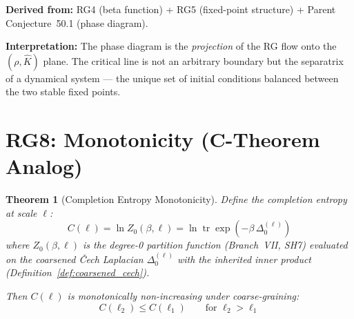 \documentclass[11pt,letterpaper]{article}
\newtheorem{theorem}[conjecture]{Theorem}
\newcommand{\Khat}{\hat{K}}
\newcommand{\tr}{\operatorname{tr}}
\begin{document}
\textbf{Derived from:} RG4 (beta function) + RG5 (fixed-point 
structure) + Parent Conjecture~50.1 (phase diagram).

\textbf{Interpretation:} The phase diagram is the \emph{projection} 
of the RG flow onto the $(\rho, \Khat)$ plane. The critical line 
is not an arbitrary boundary but the separatrix of a dynamical 
system --- the unique set of initial conditions balanced between 
the two stable fixed points.

\section{RG8: Monotonicity (C-Theorem Analog)}

\begin{theorem}[Completion Entropy 
Monotonicity]\label{thm:c_theorem}
Define the \emph{completion entropy} at scale $\ell$:
\begin{equation}\label{eq:completion_entropy}
    C(\ell) = \ln Z_0(\beta, \ell) 
    = \ln \tr \exp(-\beta \, \Delta_0^{(\ell)})
\end{equation}
where $Z_0(\beta, \ell)$ is the degree-0 partition function 
(Branch~VII, SH7) evaluated on the coarsened \v{C}ech Laplacian 
$\Delta_0^{(\ell)}$ with the inherited inner product 
(Definition~\ref{def:coarsened_cech}).

Then $C(\ell)$ is monotonically non-increasing under 
coarse-graining:
\begin{equation}\label{eq:c_monotone}
    C(\ell_2) \leq C(\ell_1) \qquad \text{for } \ell_2 > \ell_1
\end{equation}
\end{theorem}
\end{document}
